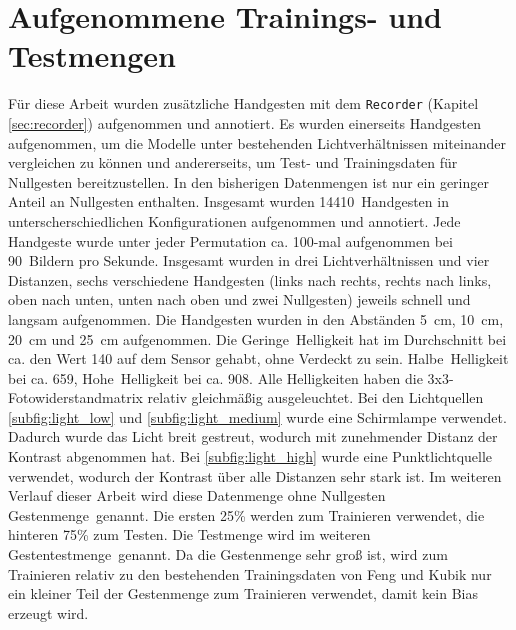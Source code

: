 \section{Aufgenommene Trainings- und Testmengen}
\label{sec:DymelData}
Für diese Arbeit wurden zusätzliche Handgesten mit dem \texttt{Recorder} (Kapitel \ref{sec:recorder}) aufgenommen und annotiert. Es wurden einerseits Handgesten aufgenommen, um die Modelle unter
bestehenden Lichtverhältnissen miteinander vergleichen zu können und andererseits, um Test- und Trainingsdaten für Nullgesten bereitzustellen. In den
bisherigen Datenmengen ist nur ein geringer Anteil an Nullgesten enthalten. Insgesamt wurden 14410~Handgesten in unterscherschiedlichen Konfigurationen aufgenommen und annotiert.
\newline
\newline
Jede Handgeste wurde unter jeder Permutation ca. 100-mal aufgenommen bei 90~Bildern pro Sekunde. Insgesamt wurden in drei Lichtverhältnissen und vier Distanzen, sechs verschiedene Handgesten (links nach rechts,
rechts nach links, oben nach unten, unten nach oben und zwei Nullgesten) jeweils schnell und langsam aufgenommen. Die Handgesten wurden in den Abständen 5~cm, 10~cm, 20~cm und 25~cm aufgenommen.
\newline
\newline
Die \glqq Geringe\grqq\ Helligkeit hat im Durchschnitt bei ca. den Wert 140 auf dem Sensor gehabt, ohne Verdeckt zu sein. \glqq Halbe\grqq\ Helligkeit bei ca. 659, \glqq Hohe\grqq\ Helligkeit bei
ca. 908. Alle Helligkeiten haben die 3x3-Fotowiderstandmatrix
relativ gleichmäßig ausgeleuchtet. Bei den Lichtquellen \ref{subfig:light_low} und \ref{subfig:light_medium} wurde eine Schirmlampe verwendet. Dadurch wurde das Licht breit gestreut,
wodurch mit zunehmender Distanz der Kontrast abgenommen hat. Bei \ref{subfig:light_high} wurde eine Punktlichtquelle verwendet, wodurch der Kontrast über alle Distanzen sehr stark ist.
Im weiteren Verlauf dieser Arbeit wird diese Datenmenge ohne Nullgesten \glqq Gestenmenge\grqq\ genannt. Die ersten 25\% werden zum Trainieren verwendet, die hinteren 75\% zum Testen. Die Testmenge
wird im weiteren \glqq Gestentestmenge\grqq\ genannt. Da die Gestenmenge sehr groß ist, wird zum Trainieren relativ zu den bestehenden Trainingsdaten von Feng und Kubik nur ein kleiner Teil der
Gestenmenge zum Trainieren verwendet, damit kein Bias erzeugt wird.
\newpage
